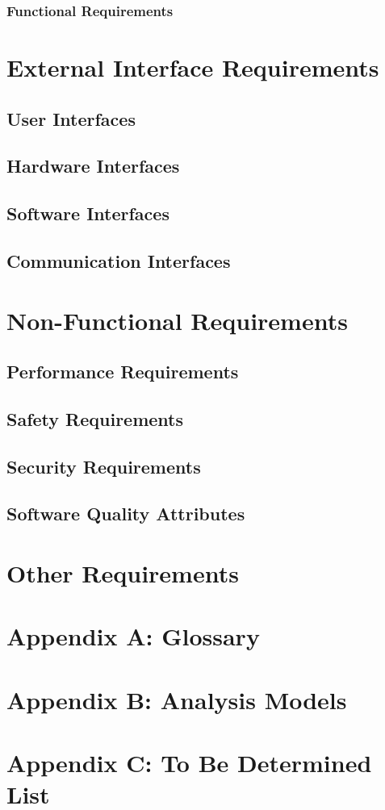 \documentclass{article}
\begin{document}
\subsubsection{Functional Requirements}

\section{External Interface Requirements}
\subsection{User Interfaces}
\subsection{Hardware Interfaces}
\subsection{Software Interfaces}
\subsection{Communication Interfaces}

\section{Non-Functional Requirements}
\subsection{Performance Requirements}
\subsection{Safety Requirements}
\subsection{Security Requirements}
\subsection{Software Quality Attributes}

\section{Other Requirements}

\appendix
\section{Appendix A: Glossary}
\section{Appendix B: Analysis Models}
\section{Appendix C: To Be Determined List}
\end{document}
